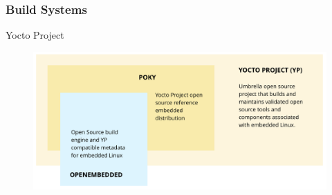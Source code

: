 \documentclass{beamer}
\begin{document}
\begin{frame}
  \frametitle{Build Systems}

  Yocto Project

  \begin{figure}
    \centering
    \includegraphics[scale=0.42]{images/yp-diagram-overview.png}
  \end{figure}

\end{frame}
\end{document}
